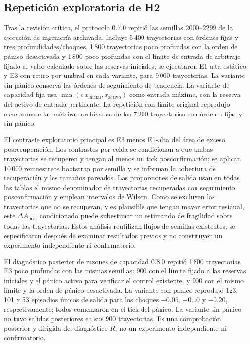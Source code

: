 \subsection{Repetición exploratoria de H2}
\label{sec:h2-replay-method}

Tras la revisión crítica, el protocolo 0.7.0 repitió las semillas 2000--2299 de la ejecución de ingeniería archivada. Incluye 5\,400 trayectorias con órdenes fijas y tres profundidades/choques, 1\,800 trayectorias poco profundas con la orden de pánico desactivada y 1\,800 poco profundas con el límite de entrada de arbitraje fijado al valor calculado sobre las reservas iniciales; se ejecutaron E1-alta estático y E3 con retiro por umbral en cada variante, para 9\,000 trayectorias. La variante sin pánico conserva las órdenes de seguimiento de tendencia. La variante de capacidad fija usa $\min(c\,x_{\mathrm{inicial}},x_{\mathrm{activo}})$ como entrada máxima, con la reserva del activo de entrada pertinente. La repetición con límite original reprodujo exactamente las métricas archivadas de las 7\,200 trayectorias con órdenes fijas y sin pánico.

El contraste exploratorio principal es E3 menos E1-alta del área de exceso posrecuperación. Los contrastes por celda se condicionan a que ambas trayectorias se recuperen y tengan al menos un tick posconfirmación; se aplican 10\,000 remuestreos bootstrap por semilla y se informan la cobertura de recuperación y los tamaños pareados. Las proporciones de salida usan en todas las tablas el mismo denominador de trayectorias recuperadas con seguimiento posconfirmación y emplean intervalos de Wilson. Como se excluyen las trayectorias que no se recuperan, y es plausible que tengan mayor error residual, este $\Delta A_{\mathrm{post}}$ condicionado puede subestimar un estimando de fragilidad sobre todas las trayectorias. Estos análisis reutilizan flujos de semillas existentes, se especificaron después de examinar resultados previos y no constituyen un experimento independiente ni confirmatorio.

El diagnóstico posterior de razones de capacidad 0.8.0 repitió 1\,800 trayectorias E3 poco profundas con las mismas semillas: 900 con el límite fijado a las reservas iniciales y el pánico activo para verificar el control existente, y 900 con el mismo límite y la orden de pánico desactivada. La variante con pánico reprodujo 123, 101 y 53 episodios únicos de salida para los choques $-0.05$, $-0.10$ y $-0.20$, respectivamente; todos comenzaron en el tick del pánico. La variante sin pánico no tuvo salidas posteriores en sus 900 trayectorias. Es una comprobación posterior y dirigida del diagnóstico $R$, no un experimento independiente ni confirmatorio.

